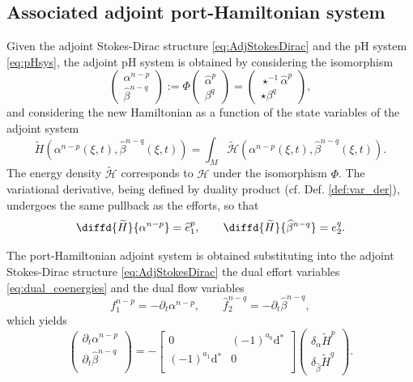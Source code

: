 \documentclass{elsarticle}
\newcommand{\revOne}[1]{{\color{black}#1}}
\renewcommand\d{\ensuremath{\mathrm{d}}}
\newcommand*{\dual}[1]{\ensuremath{\widehat{#1}}}
\begin{document}
\subsection{Associated adjoint port-Hamiltonian system}

Given the adjoint Stokes-Dirac structure \eqref{eq:AdjStokesDirac} and the pH system \eqref{eq:pHsys}, the adjoint pH system is obtained by considering the isomorphism
\[ 
\begin{pmatrix}
    \alpha^{n-p} \\
    \dual{\beta}^{n-q}
\end{pmatrix} := \Phi\begin{pmatrix}
    \dual{\alpha}^{p} \\
    \beta^{q}
\end{pmatrix} = 
\begin{pmatrix}
    \star^{-1}\dual{\alpha}^{p} \\
    \star {\beta}^{q}
\end{pmatrix},
\]
and considering the new Hamiltonian as a function of the state variables of the adjoint system
\begin{equation}
   \widetilde{H}(\alpha^{n-p}(\xi, t), \dual{\beta}^{n-q}(\xi, t)) = \int_M  \widetilde{\mathcal{H}}(\alpha^{n-p}(\xi, t), \dual{\beta}^{n-q}(\xi, t)).
\end{equation}
The energy density $\widetilde{\mathcal{H}}$ corresponds to $\mathcal{H}$ under the isomorphism $\Phi$. The variational derivative, being defined by duality product (cf. Def. \ref{def:var_der}), undergoes the same pullback as the efforts, so that
\begin{equation}\label{eq:dual_coenergies}
    \diffd{\widetilde{H}}{{\alpha}^{n-p}} = \dual{e}^p_1, \qquad  \diffd{\widetilde{H}}{\dual{\beta}^{n-q}} = {e}^q_2.
\end{equation}

The port-Hamiltonian adjoint system is obtained substituting into the adjoint Stokes-Dirac structure \eqref{eq:AdjStokesDirac} the dual effort variables \eqref{eq:dual_coenergies} and the dual \revOne{flow variables} 
\begin{equation}\label{eq:dual_flows}
{f}^{n-p}_1 = - \partial_t {\alpha}^{n-p}, \qquad \dual{f}^{n-q}_2 = - \partial_t \dual{\beta}^{n-q},   
\end{equation}
which yields
\begin{equation}\label{eq:AdjPHsys}
    \begin{pmatrix}
        \partial_t {\alpha}^{n-p} \\
        \partial_t \dual{\beta}^{n-q} \\
    \end{pmatrix} = -
    \begin{bmatrix}
        0 &  (-1)^{a_0}\d{}^* \\
        (-1)^{a_1}\d{}^* & 0 \\
    \end{bmatrix}
    \begin{pmatrix}
        \delta_{\alpha} \widetilde{H}^p \\
        \delta_{\dual{\beta}} \widetilde{H}^q
    \end{pmatrix}.
\end{equation}
\end{document}
